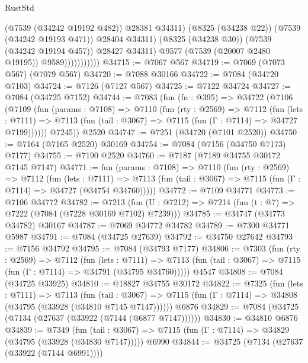 \begin{lexlean}{RustStd}
\begin{coremodule}
                                (@7539 (@34242 @19192 @482))
                                @28381
                                @34311)
                              (@8325 (@34238 @22))
                              (@7539 (@34242 @19193 @471))
                              @28404
                              @34311)
                            (@8325 (@34238 @30))
                            (@7539 (@34242 @19194 @457))
                            @28427
                            @34311)
                          @9577
                          (@7539 (@20007 @2480 @19195))
                          @9589)))))))))))
@34715 := @7067 @567
@34719 := @7069 (@7073 @567) (@7079 @567)
@34720 := @7088 @30166
@34722 := @7084 (@34720 @7103)
@34724 := @7126 (@7127 @567)
@34725 := @7122 @34724
@34727 := @7084 (@34725 @7152)
@34744 := @7083
    (fun (fn : @395) =>
    @34722
      (@7106
        (@7109
          (fun (params : @7108) =>
          @7110
            (fun (rty : @2569) =>
            @7112
              (fun (lets : @7111) =>
              @7113 (fun (tail : @3067) => @7115 (fun (Γ : @7114) => @34727 @7199))))))
        @7245))
    @2520
@34747 := @7251 (@34720 (@7101 @2520))
@34750 := @7164 (@7165 @2520) @30169
@34754 := @7084 (@7156 (@34750 @7173) @7177)
@34755 := @7190 @2520
@34760 := @7187 (@7189 @34755 @30172 @7145 @7147)
@34771 := fun (params : @7108) =>
  @7110
    (fun (rty : @2569) =>
    @7112
      (fun (lets : @7111) =>
      @7113 (fun (tail : @3067) => @7115 (fun (Γ : @7114) => @34727 (@34754 @34760)))))
@34772 := @7109 @34771
@34773 := @7106 @34772
@34782 := @7213
    (fun (U : @7212) => @7214 (fun (t : @7) => @7222 (@7084 (@7228 @30169 @7102) @7239)))
@34785 := @34747 (@34773 @34782) @30167
@34787 := @7069 @34772 @34782
@34789 := @7300 @34771 @5987
@34791 := @7084 (@34725 @27639)
@34792 := @34750 @27642
@34793 := @7156 @34792
@34795 := @7084 (@34793 @7177)
@34806 := @7303
    (fun (rty : @2569) =>
    @7112
      (fun (lets : @7111) =>
      @7113 (fun (tail : @3067) => @7115 (fun (Γ : @7114) => @34791 (@34795 @34760)))))
    @4547
@34808 := @7084 (@34725 @33925)
@34810 := @18827 @34755 @30172
@34822 := @7325
    (fun (lets : @7111) =>
    @7113
      (fun (tail : @3067) =>
      @7115 (fun (Γ : @7114) => @34808 (@34795 (@33928 (@34810 @7145 @7147))))))
    @6876
@34829 := @7084 (@34725 (@7134 (@27637 (@33922 (@7144 (@6877 @7147))))))
@34830 := @34810 @6876
@34839 := @7349
    (fun (tail : @3067) => @7115 (fun (Γ : @7114) => @34829 (@34795 (@33928 (@34830 @7147)))))
    @6990
@34844 := @34725 (@7134 (@27637 (@33922 (@7144 @6991))))

\end{coremodule}
\end{lexlean}
